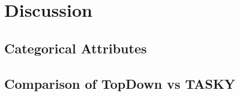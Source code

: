 \section{Discussion} \label{sec:discussions}
\subsection{Categorical Attributes}\label{subsec:categoricalAttributes}
\subsection{Comparison of TopDown vs TASKY}